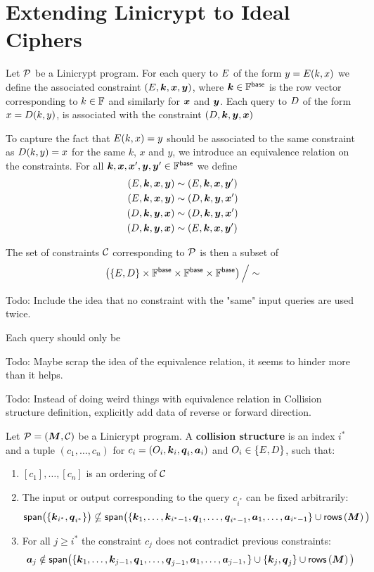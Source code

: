 \chapter{Extending Linicrypt to Ideal Ciphers}

Let $\P$ be a Linicrypt program.
For each query to $\E$ of the form $y = \E(k,x)$ we define the associated constraint
$(\E, \v k, \v x, \v y)$, where $\v k \in \F^\base$ is the row vector corresponding
to $k \in \F$ and similarly for $\v x$ and $\v y$.
Each query to $\D$ of the form $x = \D(k, y)$, is associated with the
constraint $(\D, \v k, \v y, \v x)$

To capture the fact that $\E(k, x) = y$ should be associated to the same
constraint as $\D(k,y) = x$ for the same $k$, $x$ and $y$,
we introduce an equivalence relation on the constraints. 
For all $\v k, \v x, \v x', \v y, \v y' \in \Base$ we define
\begin{align*}
    (\E, \v k,\v x, \v y) &\sim (\E, \v k, \v x, \v y') \\
    (\E, \v k,\v x, \v y) &\sim (\D, \v k, \v y, \v x') \\
    (\D, \v k,\v y, \v x) &\sim (\D, \v k, \v y, \v x') \\
    (\D, \v k,\v y, \v x) &\sim (\E, \v k, \v x, \v y') \\
\end{align*}

The set of constraints $\C$ corresponding to $\P$ is then a subset of
\[
    \left( \{\E, \D\} \times \Base \times \Base \times \Base \right) \Big/\sim
\]


Todo: Include the idea that no constraint with the "same" input queries 
are used twice.

Each query should only be 

Todo: Maybe scrap the idea of the equivalence relation, it seems to hinder more
than it helps.

Todo: Instead of doing weird things with equivalence relation in Collision structure
definition, explicitly add data of reverse or forward direction.


\begin{defn}
Let $\P = (\M, \C)$ be a Linicrypt program.
A \textbf{collision structure} is an index $i^*$ and a tuple
$(c_1, \dots, c_n)$ for $c_i = (O_i, \v k_i, \v q_i, \v a_i)$ and
$O_i \in \{\E, \D\}$, such that:
\begin{enumerate}
\item $[c_1], \dots, [c_n]$ is an ordering of $\C$
\item The input or output corresponding to the query $c_{i^*}$ can be fixed arbitrarily:
\[
\spn\big(\{ \v k_{i^*}, \v q_{i^*} \}\big) \nsubseteq
\spn\big( 
\{
\v k_1, \dots, \v k_{i^* -1},
\v q_1, \dots, \v q_{i^* -1},
\v a_1, \dots, \v a_{i^* -1}
\}
\cup \rows\left(\M\right)
\big)
\]
\item For all $j \geq i^*$ the constraint $c_j$ does not contradict previous constraints: 
\[
\v a_j \notin \spn\big( \{
\v k_1, \dots, \v k_{j -1},
\v q_1, \dots, \v q_{j -1},
\v a_1, \dots, \v a_{j -1},
\} 
\cup \{ \v k_j, \v q_j\}
\cup \rows\left(\M\right)
\big)
\]
\end{enumerate}
\end{defn}
